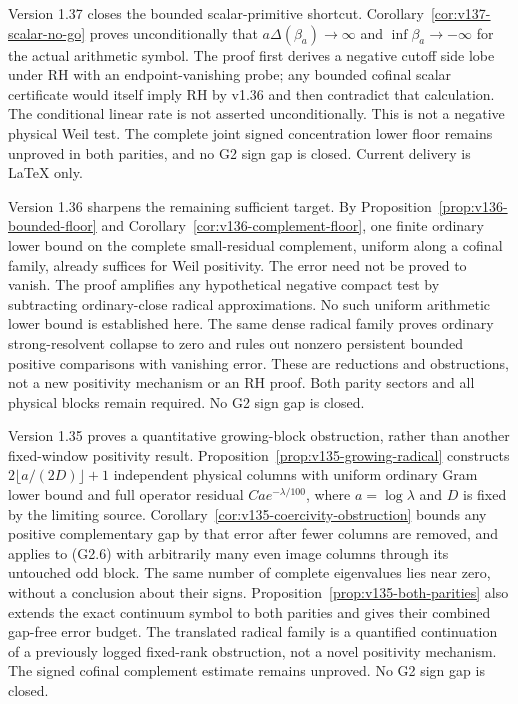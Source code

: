 \documentclass[11pt]{article}
\theoremstyle{remark}
\begin{document}
Version 1.37 closes the bounded scalar-primitive shortcut.
Corollary~\ref{cor:v137-scalar-no-go} proves unconditionally that
$a\Delta(\beta_a)\to\infty$ and $\inf\beta_a\to-\infty$ for the actual
arithmetic symbol. The proof first derives a negative cutoff side lobe
under RH with an endpoint-vanishing probe; any bounded cofinal scalar
certificate would itself imply RH by v1.36 and then contradict that
calculation. The conditional linear rate is not asserted unconditionally.
This is not a negative physical Weil test. The complete joint signed
concentration lower floor remains unproved in both parities, and no G2
sign gap is closed. Current delivery is LaTeX only.

Version 1.36 sharpens the remaining sufficient target. By
Proposition~\ref{prop:v136-bounded-floor} and
Corollary~\ref{cor:v136-complement-floor}, one finite ordinary lower bound
on the complete small-residual complement, uniform along a cofinal family,
already suffices for Weil positivity. The error need not be proved to
vanish. The proof amplifies any hypothetical negative compact test by
subtracting ordinary-close radical approximations. No such uniform
arithmetic lower bound is established here. The same dense radical family
proves ordinary strong-resolvent collapse to zero and rules out nonzero
persistent bounded positive comparisons with vanishing error. These are
reductions and obstructions, not a new positivity mechanism or an RH proof.
Both parity sectors and all physical blocks remain required. No G2 sign
gap is closed.

Version 1.35 proves a quantitative growing-block obstruction, rather
than another fixed-window positivity result.  Proposition~\ref{prop:v135-growing-radical}
constructs $2\lfloor a/(2D)\rfloor+1$ independent physical columns with
uniform ordinary Gram lower bound and full operator residual
$Ca e^{-\lambda/100}$, where $a=\log\lambda$ and $D$ is fixed by the
limiting source.  Corollary~\ref{cor:v135-coercivity-obstruction} bounds
any positive complementary gap by that error after fewer columns are
removed, and applies to (G2.6) with arbitrarily many even image columns
through its untouched odd block.  The same number of complete eigenvalues
lies near zero, without a conclusion about their signs.
Proposition~\ref{prop:v135-both-parities} also extends the exact continuum
symbol to both parities and gives their combined gap-free error budget.
The translated radical family is a quantified continuation of a previously
logged fixed-rank obstruction, not a novel positivity mechanism.  The
signed cofinal complement estimate remains unproved. No G2 sign gap is closed.
\end{document}
